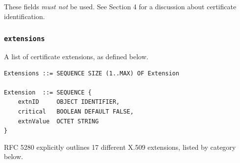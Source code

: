 These fields \textit{must not} be used.
See Section 4 for a discussion about certificate identification.

\subsubsection{\texttt{extensions}}

A list of certificate extensions, as defined below.

\begin{verbatim}
Extensions ::= SEQUENCE SIZE (1..MAX) OF Extension

Extension  ::= SEQUENCE {
    extnID     OBJECT IDENTIFIER,
    critical   BOOLEAN DEFAULT FALSE,
    extnValue  OCTET STRING
}
\end{verbatim}

RFC 5280 explicitly outlines 17 different X.509 extensions, listed by category below.

